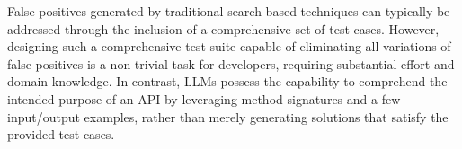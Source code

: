 False positives generated by traditional search-based techniques can typically be addressed through the inclusion of a comprehensive set of test cases. However, designing such a comprehensive test suite capable of eliminating all variations of false positives is a non-trivial task for developers, requiring substantial effort and domain knowledge. In contrast, LLMs possess the capability to comprehend the intended purpose of an API by leveraging method signatures and a few input/output examples, rather than merely generating solutions that satisfy the provided test cases.



